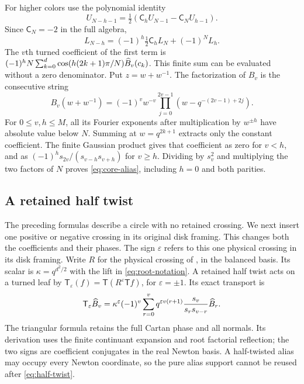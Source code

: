 \documentclass[11pt]{article}
\numberwithin{equation}{section}
\theoremstyle{definition}\newtheorem{definition}[theorem]{Definition}
\theoremstyle{remark}\newtheorem{remark}[theorem]{Remark}
\newcommand{\Turn}{\mathsf T}\newcommand{\Cheb}{\mathsf C}
\newcommand{\eps}{\varepsilon}
\begin{document}
For higher colors use the polynomial identity
\[
 U_{N-h-1}=\tfrac12(\Cheb_hU_{N-1}-\Cheb_NU_{h-1}).
\]
Since $\Cheb_N=-2$ in the full algebra,
\[
 L_{N-h}=(-1)^h\tfrac12\Cheb_hL_N+(-1)^NL_h.
\]
The $v$th turned coefficient of the first term is
$(-1)^hN\sum_{k=0}^{d}\cos(h(2k+1)\pi/N)\widehat B_v(c_k)$.
This finite sum can be evaluated without a zero denominator. Put $z=w+w^{-1}$. The factorization of $B_v$ is the consecutive string
\[
 B_v(w+w^{-1})=(-1)^vw^{-v}
 \prod_{j=0}^{2v-1}\left(w-q^{-(2v-1)+2j}\right).
\]
For $0\le v,h\le M$, all its Fourier exponents after multiplication by $w^{\pm h}$ have absolute value below $N$. Summing at $w=q^{2k+1}$ extracts only the constant coefficient. The finite Gaussian product gives that coefficient as zero for $v<h$, and as
$(-1)^h s_{2v}/(s_{v-h}s_{v+h})$ for $v\ge h$. Dividing by $s_v^2$ and multiplying the two factors of $N$ proves \eqref{eq:core-alias}, including $h=0$ and both parities.


\subsection{A retained half twist}

The preceding formulas describe a circle with no retained crossing. We next insert one positive or negative crossing in its original disk framing. This changes both the coefficients and their phases. The sign $\eps$ refers to this one physical crossing in its disk framing.
Write $R$ for the physical crossing of
\cite[Proposition 5.1]{Finite}, in the balanced basis. Its scalar is
$\kappa=q^{d^2/2}$ with the lift in \eqref{eq:root-notation}.
A retained half twist acts on a turned leaf by
$\Turn_\eps(f)=\Turn(R^\eps\Turn f)$, for $\eps=\pm1$. Its exact transport is
\begin{equation}\label{eq:half-twist}
 \Turn_\eps\Bhat_v=\kappa^\eps(-1)^v
 \sum_{r=0}^{v}q^{\eps v(r+1)}
 \frac{s_v}{s_rs_{v-r}}\Bhat_r.
\end{equation}
The triangular formula retains the full Cartan phase and all normals. Its derivation uses the finite continuant expansion and root factorial reflection; the two signs are coefficient conjugates in the real Newton basis. A half-twisted alias may occupy every Newton coordinate, so the pure alias support cannot be reused after \eqref{eq:half-twist}.
\end{document}
